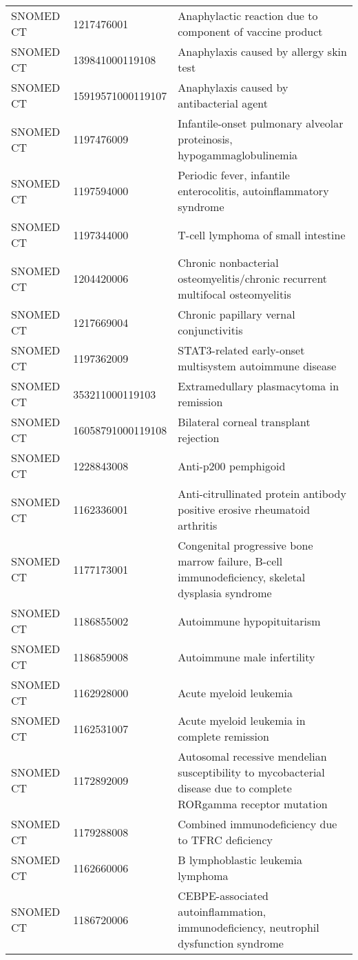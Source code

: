 \begin{longtable}{p{}p{}p{}}
  SNOMED CT & 1217476001 & Anaphylactic reaction due to component of vaccine product \\ 
  SNOMED CT & 139841000119108 & Anaphylaxis caused by allergy skin test \\ 
  SNOMED CT & 15919571000119107 & Anaphylaxis caused by antibacterial agent \\ 
  SNOMED CT & 1197476009 & Infantile-onset pulmonary alveolar proteinosis, hypogammaglobulinemia \\ 
  SNOMED CT & 1197594000 & Periodic fever, infantile enterocolitis, autoinflammatory syndrome \\ 
  SNOMED CT & 1197344000 & T-cell lymphoma of small intestine \\ 
  SNOMED CT & 1204420006 & Chronic nonbacterial osteomyelitis/chronic recurrent multifocal osteomyelitis \\ 
  SNOMED CT & 1217669004 & Chronic papillary vernal conjunctivitis \\ 
  SNOMED CT & 1197362009 & STAT3-related early-onset multisystem autoimmune disease \\ 
  SNOMED CT & 353211000119103 & Extramedullary plasmacytoma in remission \\ 
  SNOMED CT & 16058791000119108 & Bilateral corneal transplant rejection \\ 
  SNOMED CT & 1228843008 & Anti-p200 pemphigoid \\ 
  SNOMED CT & 1162336001 & Anti-citrullinated protein antibody positive erosive rheumatoid arthritis \\ 
  SNOMED CT & 1177173001 & Congenital progressive bone marrow failure, B-cell immunodeficiency, skeletal dysplasia syndrome \\ 
  SNOMED CT & 1186855002 & Autoimmune hypopituitarism \\ 
  SNOMED CT & 1186859008 & Autoimmune male infertility \\ 
  SNOMED CT & 1162928000 & Acute myeloid leukemia \\ 
  SNOMED CT & 1162531007 & Acute myeloid leukemia in complete remission \\ 
  SNOMED CT & 1172892009 & Autosomal recessive mendelian susceptibility to mycobacterial disease due to complete RORgamma receptor mutation \\ 
  SNOMED CT & 1179288008 & Combined immunodeficiency due to TFRC deficiency \\ 
  SNOMED CT & 1162660006 & B lymphoblastic leukemia lymphoma \\ 
  SNOMED CT & 1186720006 & CEBPE-associated autoinflammation, immunodeficiency, neutrophil dysfunction syndrome \\ 

\end{longtable}
